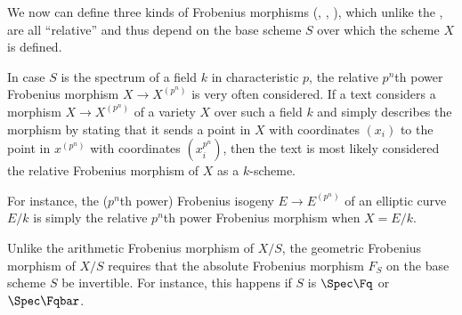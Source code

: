 We now can define three kinds of Frobenius morphisms (, , ), which unlike the , are all ``relative'' and thus depend on the base scheme $S$ over which the scheme $X$ is defined.




\begin{remark} \label{remark:relative_frobenius_morphisms_of_schemes_over_characteristic_p_fields_are_very_often_considered}
In case $S$ is the spectrum of a field $k$ in characteristic $p$, the relative $p^n$th power Frobenius morphism $X \to X^{(p^n)}$ is very often considered. 
If a text considers a morphism $X \to X^{(p^n)}$ of a variety $X$ over such a field $k$ and simply describes the morphism by stating that it sends a point in $X$ with coordinates $(x_i)$ to the point in $x^{(p^n)}$ with coordinates $(x_i^{p^n})$, then the text is most likely considered the relative Frobenius morphism of $X$ as a $k$-scheme. 

For instance, the ($p^n$th power) Frobenius isogeny $E \to E^{(p^n)}$ of an elliptic curve $E/k$ is simply the relative $p^n$th power Frobenius morphism when $X = E/k$.
\end{remark}



Unlike the arithmetic Frobenius morphism of $X/S$, the geometric Frobenius morphism of $X/S$ requires that the absolute Frobenius morphism $F_{S}$ on the base scheme $S$ be invertible. For instance, this happens if $S$ is $\Spec \Fq$ or $\Spec \Fqbar$.  

